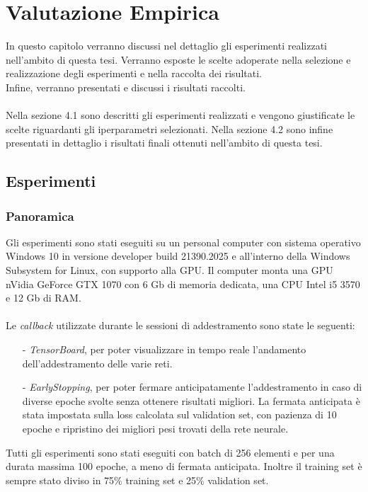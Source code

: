 \chapter{Valutazione Empirica}
In questo capitolo verranno discussi nel dettaglio gli esperimenti realizzati nell'ambito di questa tesi. Verranno esposte le scelte adoperate nella selezione e realizzazione degli esperimenti e nella raccolta dei risultati.\\
Infine, verranno presentati e discussi i risultati raccolti.\\\\
Nella sezione 4.1 sono descritti gli esperimenti realizzati e vengono giustificate le scelte riguardanti gli iperparametri selezionati. Nella sezione 4.2 sono infine presentati in dettaglio i risultati finali ottenuti nell'ambito di questa tesi.
\section{Esperimenti}
\subsection{Panoramica} 
Gli esperimenti sono stati eseguiti su un personal computer con sistema operativo Windows 10 in versione developer build 21390.2025 e all'interno della Windows Subsystem for Linux, con supporto alla GPU. Il computer monta una GPU nVidia GeForce GTX 1070 con 6 Gb di memoria dedicata, una CPU Intel i5 3570 e 12 Gb di RAM.\\\\
Le \textit{callback} utilizzate durante le sessioni di addestramento sono state le seguenti:
\begin{itemize}
    \item[-] \textit{TensorBoard}, per poter visualizzare in tempo reale l'andamento dell'addestramento delle varie reti.
    
    \item[-] \textit{EarlyStopping}, per poter fermare anticipatamente l'addestramento in caso di diverse epoche svolte senza ottenere risultati migliori. La fermata anticipata è stata impostata sulla loss calcolata sul validation set, con pazienza di 10 epoche e ripristino dei migliori pesi trovati della rete neurale.
    
\end{itemize}
Tutti gli esperimenti sono stati eseguiti con batch di 256 elementi e per una durata massima 100 epoche, a meno di fermata anticipata. Inoltre il training set è sempre stato diviso in 75\% training set e 25\% validation set.

